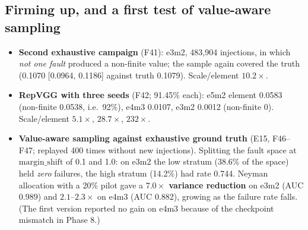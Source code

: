 \subsection{Firming up, and a first test of value-aware sampling}
\begin{itemize}
\item \textbf{Second exhaustive campaign} (F41): e3m2, 483{,}904 injections, in which \emph{not one fault} produced a non-finite value; the sample again covered the truth (0.1070 [0.0964, 0.1186] against truth 0.1079). Scale/element $10.2\times$.
\item \textbf{RepVGG with three seeds} (F42; 91.45\% each): e5m2 element 0.0583 (non-finite 0.0538, i.e.\ 92\%), e4m3 0.0107, e3m2 0.0012 (non-finite 0). Scale/element $5.1\times$, $28.7\times$, $232\times$.
\item \textbf{Value-aware sampling against exhaustive ground truth} (E15, F46--F47; replayed 400 times without new injections). Splitting the fault space at $\mathrm{margin\_shift}$ of 0.1 and 1.0: on e3m2 the low stratum (38.6\% of the space) held \emph{zero} failures, the high stratum (14.2\%) had rate 0.744. Neyman allocation with a 20\% pilot gave a \textbf{$7.0\times$ variance reduction} on e3m2 (AUC 0.989) and $2.1$--$2.3\times$ on e4m3 (AUC 0.882),
 growing as the failure rate falls. (The first version reported no gain on e4m3 because of the checkpoint mismatch in Phase 8.)
\end{itemize}


